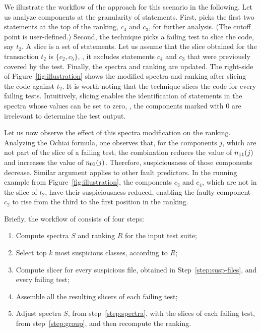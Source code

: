 \documentclass{article}
\begin{document}
We illustrate the workflow of the \comb{} approach for this scenario
in the following. Let us analyze components at the granularity of
statements. First, \comb{} picks the first two statements at the top
of the ranking, $c_4$ and $c_3$, for further analysis.  (The cutoff
point is user-defined.) Second, the technique picks a failing test to
slice the code, say $t_2$. A slice is a set of statements. Let us
assume that the slice obtained for the transaction $t_2$ is $\{c_2,
c_5\}$, \ie, it excludes statements $c_4$ and $c_3$ that were
previously covered by the test. Finally, the spectra and ranking are
updated. The right-side of Figure~\ref{fig:illustration} shows the
modified spectra and ranking after slicing the code against $t_2$. It
is worth noting that the technique slices the code for every failing
tests. Intuitively, slicing enables the identification of statements
in the spectra whose values can be set to zero, \ie{}, the components
marked with $0$ are irrelevant to determine the test output.

Let us now observe the effect of this spectra modification on the
ranking. Analyzing the Ochiai formula, one observes that, for the
components $j$, which are not part of the slice of a failing test, the
combination reduces the value of $n_{11}(j)$ and increases the value of
$n_{01}(j)$. Therefore, suspiciousness of those components
decrease. Similar argument applies to other fault predictors. In the
running example from Figure~\ref{fig:illustration}, the components
$c_3$ and $c_4$, which are not in the slice of $t_2$, have their
suspiciousness reduced, enabling the faulty component $c_2$ to rise
from the third to the first position in the ranking.

\vspace{1ex}
Briefly, the workflow of \comb{} consists of four steps:
\begin{enumerate}
  \itemsep0em
  \item\label{step:spectra} Compute spectra $S$ and ranking $R$ for
  the input test suite;
  \item\label{step:susp-files} Select top $k$ most suspicious classes, according to $R$;
  \item\label{step:compute-slice} Compute slicer for every suspicious
    file, obtained in Step~\ref{step:susp-files}, and every failing test;
  \item\label{step:group} Assemble all the resulting slicers of each failing test;
  \item Adjust spectra $S$, from step~\ref{step:spectra}, with
    the slices of each failing test, from
    step~\ref{step:group}, and then
	recompute the ranking.
\end{enumerate}
\end{document}
